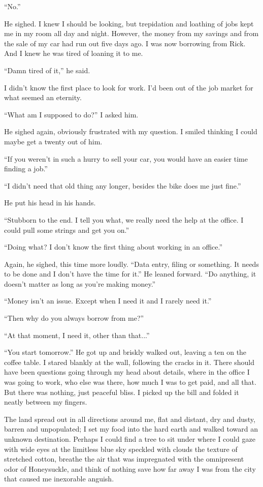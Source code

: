 \documentclass[
]{article}
\begin{document}
``No.''

He sighed. I knew I should be looking, but trepidation and loathing of
jobs kept me in my room all day and night. However, the money from my
savings and from the sale of my car had run out five days ago. I was now
borrowing from Rick. And I knew he was tired of loaning it to me.

``Damn tired of it,'' he said.

I didn't know the first place to look for work. I'd been out of the job
market for what seemed an eternity.

``What am I supposed to do?'' I asked him.

He sighed again, obviously frustrated with my question. I smiled
thinking I could maybe get a twenty out of him.

``If you weren't in such a hurry to sell your car, you would have an
easier time finding a job.''

``I didn't need that old thing any longer, besides the bike does me just
fine.''

He put his head in his hands.

``Stubborn to the end. I tell you what, we really need the help at the
office. I could pull some strings and get you on.''

``Doing what? I don't know the first thing about working in an office.''

Again, he sighed, this time more loudly. ``Data entry, filing or
something. It needs to be done and I don't have the time for it.'' He
leaned forward. ``Do anything, it doesn't matter as long as you're
making money.''

``Money isn't an issue. Except when I need it and I rarely need it.''

``Then why do you always borrow from me?''

``At that moment, I need it, other than that...''

``You start tomorrow.'' He got up and briskly walked out, leaving a ten
on the coffee table. I stared blankly at the wall, following the cracks
in it. There should have been questions going through my head about
details, where in the office I was going to work, who else was there,
how much I was to get paid, and all that. But there was nothing, just
peaceful bliss. I picked up the bill and folded it neatly between my
fingers.

The land spread out in all directions around me, flat and distant, dry
and dusty, barren and unpopulated; I set my food into the hard earth and
walked toward an unknown destination. Perhaps I could find a tree to sit
under where I could gaze with wide eyes at the limitless blue sky
speckled with clouds the texture of stretched cotton, breathe the air
that was impregnated with the omnipresent odor of Honeysuckle, and think
of nothing save how far away I was from the city that caused me
inexorable anguish.
\end{document}
